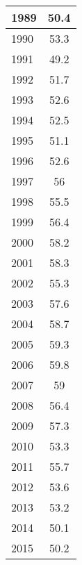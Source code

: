 \documentclass{mcmthesis}
\begin{document}
\begin{appendices}
\begin{minipage}{\textwidth}
\begin{minipage}[t]{0.45\textwidth}
\begin{tabular}{|l|c|}
            1989 & 50.4                       \\ \hline
            1990 & 53.3                       \\ \hline
            1991 & 49.2                       \\ \hline
            1992 & 51.7                       \\ \hline
            1993 & 52.6                       \\ \hline
            1994 & 52.5                       \\ \hline
            1995 & 51.1                       \\ \hline
            1996 & 52.6                       \\ \hline
            1997 & 56                         \\ \hline
            1998 & 55.5                       \\ \hline
            1999 & 56.4                       \\ \hline
            2000 & 58.2                       \\ \hline
            2001 & 58.3                       \\ \hline
            2002 & 55.3                       \\ \hline
            2003 & 57.6                       \\ \hline
            2004 & 58.7                       \\ \hline
            2005 & 59.3                       \\ \hline
            2006 & 59.8                       \\ \hline
            2007 & 59                         \\ \hline
            2008 & 56.4                       \\ \hline
            2009 & 57.3                       \\ \hline
            2010 & 53.3                       \\ \hline
            2011 & 55.7                       \\ \hline
            2012 & 53.6                       \\ \hline
            2013 & 53.2                       \\ \hline
            2014 & 50.1                       \\ \hline
            2015 & 50.2                       \\ \hline
            \end{tabular}
  \end{minipage}
\end{minipage}


\end{appendices}
\end{document}
